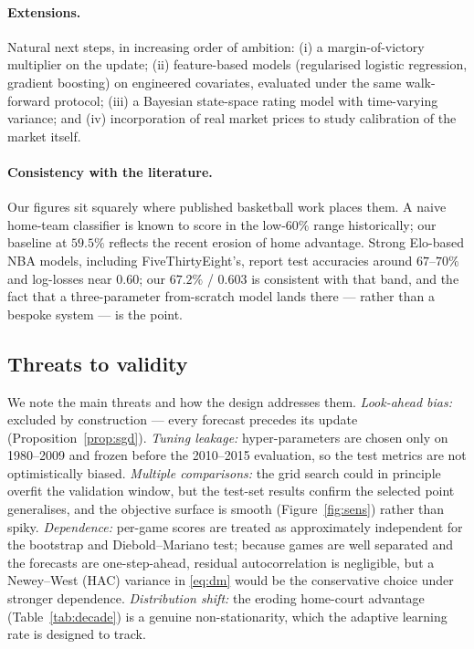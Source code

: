 \documentclass[11pt]{article}
\begin{document}
\paragraph{Extensions.} Natural next steps, in increasing order of ambition:
(i) a margin-of-victory multiplier on the update; (ii) feature-based models
(regularised logistic regression, gradient boosting) on engineered covariates,
evaluated under the same walk-forward protocol; (iii) a Bayesian state-space
rating model with time-varying variance; and (iv) incorporation of real market
prices to study calibration of the market itself.

\paragraph{Consistency with the literature.} Our figures sit squarely where
published basketball work places them. A naive home-team classifier is known to
score in the low-$60\%$ range historically; our baseline at $59.5\%$ reflects the
recent erosion of home advantage. Strong Elo-based NBA models, including
FiveThirtyEight's, report test accuracies around $67$--$70\%$ and log-losses near
$0.60$; our $67.2\%$ / $0.603$ is consistent with that band, and the fact that a
three-parameter from-scratch model lands there --- rather than a bespoke system ---
is the point.

\subsection{Threats to validity}
We note the main threats and how the design addresses them.
\emph{Look-ahead bias:} excluded by construction --- every forecast precedes its
update (Proposition~\ref{prop:sgd}). \emph{Tuning leakage:} hyper-parameters are
chosen only on 1980--2009 and frozen before the 2010--2015 evaluation, so the test
metrics are not optimistically biased. \emph{Multiple comparisons:} the grid search
could in principle overfit the validation window, but the test-set results confirm
the selected point generalises, and the objective surface is smooth
(Figure~\ref{fig:sens}) rather than spiky. \emph{Dependence:} per-game scores are
treated as approximately independent for the bootstrap and Diebold--Mariano test;
because games are well separated and the forecasts are one-step-ahead, residual
autocorrelation is negligible, but a Newey--West (HAC) variance in \eqref{eq:dm}
would be the conservative choice under stronger dependence. \emph{Distribution
shift:} the eroding home-court advantage (Table~\ref{tab:decade}) is a genuine
non-stationarity, which the adaptive learning rate is designed to track.
\end{document}
